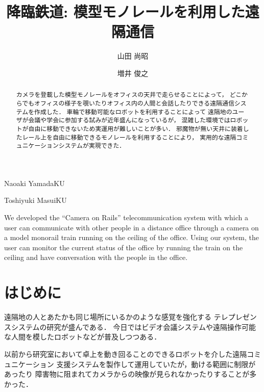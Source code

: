 \documentclass[submit,techreq]{ipsj}
\begin{document}
\title{降臨鉄道: 模型モノレールを利用した遠隔通信}


\author{山田 尚昭}{Naoaki Yamada}{KU}
\author{増井 俊之}{Toshiyuki Masui}{KU}

\begin{abstract}
カメラを登載した模型モノレールをオフィスの天井で走らせることによって，
どこからでもオフィスの様子を覗いたりオフィス内の人間と会話したりできる遠隔通信システムを作成した．
車輪で移動可能なロボットを利用することによって
遠隔地のユーザが会議や学会に参加する試みが近年盛んになっているが，
混雑した環境ではロボットが自由に移動できないため実運用が難しいことが多い．
邪魔物が無い天井に装着したレール上を自由に移動できるモノレールを利用することにより，
実用的な遠隔コミュニケーションシステムが実現できた．
\end{abstract}

\begin{eabstract}
We developed the ``Camera on Rails'' telecommunication system with
which a user can communicate with other people in a
distance office through a camera on a model monorail train running on the ceiling
of the office. Using our system, the user can monitor the current status
of the office by running the train on the ceiling and have
conversation with the people in the office.
\end{eabstract}

\maketitle

\section{はじめに}

遠隔地の人とあたかも同じ場所にいるかのような感覚を強化する
テレプレゼンスシステムの研究が盛んである．
今日ではビデオ会議システムや遠隔操作可能な人間を模したロボットなどが普及しつつある．

以前から研究室において卓上を動き回ることのできるロボットを介した遠隔コミュニケーション
支援システムを製作して運用していたが\cite{Hirota:Korin}，動ける範囲に制限があったり
障害物に阻まれてカメラからの映像が見られなかったりすることが多かった．
\end{document}
